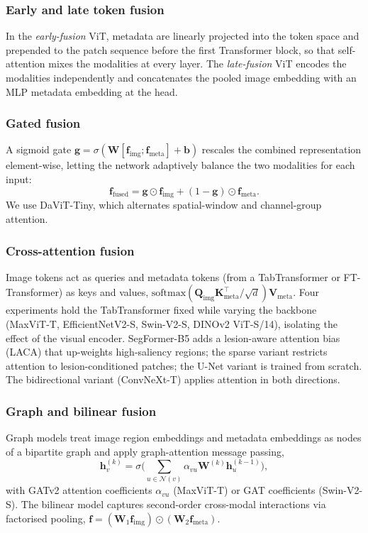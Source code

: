 \documentclass[journal]{IEEEtran}
\begin{document}
\subsubsection{Early and late token fusion}
In the \emph{early-fusion} ViT, metadata are linearly projected into the token space and prepended to the patch sequence before the first Transformer block, so that self-attention mixes the modalities at every layer. The \emph{late-fusion} ViT encodes the modalities independently and concatenates the pooled image embedding with an MLP metadata embedding at the head.

\subsubsection{Gated fusion}
A sigmoid gate $\mathbf g=\sigma(\mathbf W[\mathbf f_{\text{img}};\mathbf f_{\text{meta}}]+\mathbf b)$ rescales the combined representation element-wise, letting the network adaptively balance the two modalities for each input:
\begin{equation}
\mathbf f_{\text{fused}}=\mathbf g\odot\mathbf f_{\text{img}}+(1-\mathbf g)\odot\mathbf f_{\text{meta}}.
\end{equation}
We use DaViT-Tiny, which alternates spatial-window and channel-group attention.

\subsubsection{Cross-attention fusion}
Image tokens act as queries and metadata tokens (from a TabTransformer or FT-Transformer) as keys and values, $\mathrm{softmax}(\mathbf Q_{\text{img}}\mathbf K_{\text{meta}}^\top/\sqrt d)\mathbf V_{\text{meta}}$. Four experiments hold the TabTransformer fixed while varying the backbone (MaxViT-T, EfficientNetV2-S, Swin-V2-S, DINOv2 ViT-S/14), isolating the effect of the visual encoder. SegFormer-B5 adds a lesion-aware attention bias (LACA) that up-weights high-saliency regions; the sparse variant restricts attention to lesion-conditioned patches; the U-Net variant is trained from scratch. The bidirectional variant (ConvNeXt-T) applies attention in both directions.

\subsubsection{Graph and bilinear fusion}
Graph models treat image region embeddings and metadata embeddings as nodes of a bipartite graph and apply graph-attention message passing,
\begin{equation}
\mathbf h_v^{(k)}=\sigma\Big(\textstyle\sum_{u\in\mathcal N(v)}\alpha_{vu}\mathbf W^{(k)}\mathbf h_u^{(k-1)}\Big),
\end{equation}
with GATv2 attention coefficients $\alpha_{vu}$ (MaxViT-T) or GAT coefficients (Swin-V2-S). The bilinear model captures second-order cross-modal interactions via factorised pooling, $\mathbf f=(\mathbf W_1\mathbf f_{\text{img}})\odot(\mathbf W_2\mathbf f_{\text{meta}})$.
\end{document}
